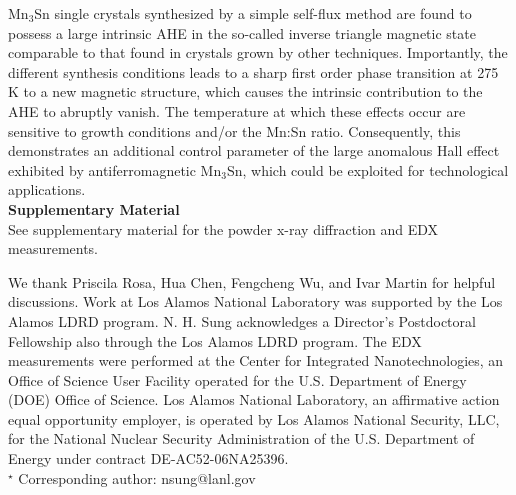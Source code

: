 \documentclass[prb,twocolumn,showpacs,preprintnumbers,amsmath,amssymb]{revtex4}
\begin{document}
Mn$_3$Sn single crystals synthesized by a simple self-flux method are found to possess a large intrinsic AHE in the so-called inverse triangle magnetic state comparable to that found in crystals grown by other techniques.\cite{Nakatsuji2015, SParkin2016}
Importantly, the different synthesis conditions leads to a sharp first order phase transition at 275 K to a new magnetic structure, which causes the intrinsic contribution to the AHE to abruptly vanish. The temperature at which these effects occur are sensitive to growth conditions and/or the Mn:Sn ratio. Consequently, this demonstrates an additional control parameter of the large anomalous Hall effect exhibited by antiferromagnetic Mn$_3$Sn, which could be exploited for technological applications.\\

\textbf{Supplementary Material}\\
See supplementary material for the powder x-ray diffraction and EDX measurements.

\acknowledgments
We thank Priscila Rosa, Hua Chen, Fengcheng Wu, and Ivar Martin for helpful discussions. 
Work at Los Alamos National Laboratory was supported by the Los Alamos LDRD program.
 N. H. Sung acknowledges a Director's Postdoctoral Fellowship also through the Los Alamos LDRD program. 
The EDX measurements were performed at the Center for Integrated Nanotechnologies, an Office of Science User Facility operated for the U.S. Department of Energy (DOE) Office of Science. Los Alamos National Laboratory, an affirmative action equal opportunity employer, is operated by Los Alamos National Security, LLC, for the National Nuclear Security Administration of the U.S. Department of Energy under contract DE-AC52-06NA25396. 
\\

\noindent $^{\star}$ Corresponding author: nsung@lanl.gov


\newpage
\end{document}
